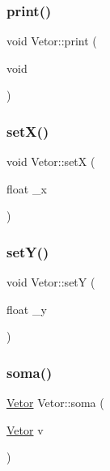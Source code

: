 \mbox{\label{class_vetor_a253a700dc67db860e2ae8247f114990e}} 
\subsubsection{\texorpdfstring{print()}{print()}}
{\footnotesize\ttfamily void Vetor\+::print (\begin{DoxyParamCaption}\item[{void}]{ }\end{DoxyParamCaption})}

\mbox{\label{class_vetor_a45e972d26987116ae8c89fefb09f5737}} 
\subsubsection{\texorpdfstring{set\+X()}{setX()}}
{\footnotesize\ttfamily void Vetor\+::setX (\begin{DoxyParamCaption}\item[{float}]{\+\_\+x }\end{DoxyParamCaption})}

\mbox{\label{class_vetor_a25c01341d46beebd3f4bf054d576772e}} 
\subsubsection{\texorpdfstring{set\+Y()}{setY()}}
{\footnotesize\ttfamily void Vetor\+::setY (\begin{DoxyParamCaption}\item[{float}]{\+\_\+y }\end{DoxyParamCaption})}

\mbox{\label{class_vetor_a32c6e9bcc96a7d54b3b2fe1d3c0d84c1}} 
\subsubsection{\texorpdfstring{soma()}{soma()}}
{\footnotesize\ttfamily \hyperlink{class_vetor}{Vetor} Vetor\+::soma (\begin{DoxyParamCaption}\item[{\hyperlink{class_vetor}{Vetor}}]{v }\end{DoxyParamCaption})}

